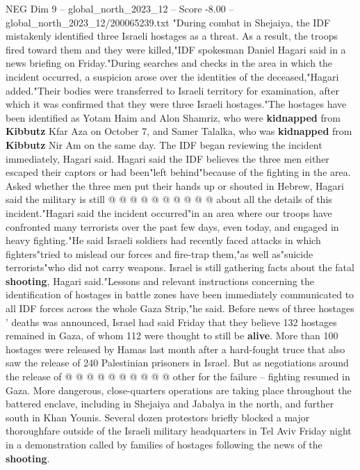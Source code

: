 \begin{textsample}{NEG Dim 9 – global\_north\_2023\_12 – Score -8.00 – global\_north\_2023\_12/200065239.txt}  \label{ex:f9_neg_075}
"During combat in Shejaiya, the IDF mistakenly identified three Israeli hostages as a threat.
As a result, the troops fired toward them and they were killed,"IDF spokesman Daniel Hagari said in a news briefing on Friday."During searches and checks in the area in which the incident occurred, a suspicion arose over the identities of the deceased,"Hagari added."Their bodies were transferred to Israeli territory for examination, after which it was confirmed that they were three Israeli hostages."The hostages have been identified as Yotam Haim and Alon Shamriz, who were \textbf{kidnapped} from \textbf{Kibbutz} Kfar Aza on October 7, and Samer Talalka, who was \textbf{kidnapped} from \textbf{Kibbutz} Nir Am on the same day.
The IDF began reviewing the incident immediately, Hagari said.
Hagari said the IDF believes the three men either escaped their captors or had been"left behind"because of the fighting in the area.
Asked whether the three men put their hands up or shouted in Hebrew, Hagari said the military is still @ @ @ @ @ @ @ @ @ @ about all the details of this incident."Hagari said the incident occurred"in an area where our troops have confronted many terrorists over the past few days, even today, and engaged in heavy fighting."He said Israeli soldiers had recently faced attacks in which fighters"tried to mislead our forces and fire-trap them,"as well as"suicide terrorists"who did not carry weapons.
Israel is still gathering facts about the fatal \textbf{shooting}, Hagari said."Lessons and relevant instructions concerning the identification of hostages in battle zones have been immediately communicated to all IDF forces across the whole Gaza Strip,"he said.
Before news of three hostages ' deaths was announced, Israel had said Friday that they believe 132 hostages remained in Gaza, of whom 112 were thought to still be \textbf{alive}.
More than 100 hostages were released by Hamas last month after a hard-fought truce that also saw the release of 240 Palestinian prisoners in Israel.
But as negotiations around the release of @ @ @ @ @ @ @ @ @ @ other for the failure -- fighting resumed in Gaza.
More dangerous, close-quarters operations are taking place throughout the battered enclave, including in Shejaiya and Jabalya in the north, and further south in Khan Younis.
Several dozen protestors briefly blocked a major thoroughfare outside of the Israeli military headquarters in Tel Aviv Friday night in a demonstration called by families of hostages following the news of the \textbf{shooting}.

\end{textsample}
